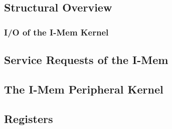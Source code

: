 \subsection{Structural Overview}

%
%
\subsubsection{I/O of the I-Mem Kernel}

%
%
%
\subsection{Service Requests of the I-Mem}

\subsection{The I-Mem Peripheral Kernel}
\label{subsec:imemfunc02}

%
\subsection{Registers}


